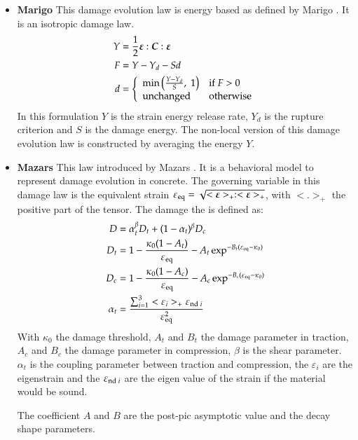 \begin{itemize}
\item \textbf{Marigo}
This damage evolution law is energy based as defined by Marigo \cite{marigo81a,
  lemaitre96a}. It is an isotropic damage law.
\begin{align}
  Y &= \frac{1}{2}\boldsymbol{\varepsilon}:\boldsymbol{C}:\boldsymbol{\varepsilon}\\
  F &= Y - Y_d - S d\\
  d &= \left\{
    \begin{array}{l l}
      \mathrm{min}\left(\frac{Y-Y_d}{S},\;1\right) & \mathrm{if}\; F > 0\\
      \mathrm{unchanged} & \mathrm{otherwise}
    \end{array}
  \right.
\end{align}
In this formulation $Y$ is the strain  energy release rate, $Y_d$ is the rupture
criterion and  $S$ is the damage  energy.  The non-local version  of this damage
evolution law is constructed by averaging the energy $Y$.

\item \textbf{Mazars}
This law introduced by Mazars \cite{mazars84a}. It is a behavioral model to
represent damage evolution in concrete. The governing variable in this damage
law is the equivalent strain $\varepsilon_{{\mathrm{eq}}} =
\sqrt{<\boldsymbol{\varepsilon}>_+:<\boldsymbol{\varepsilon}>_+}$, with $<.>_+$ the positive
part of the tensor.
The damage the is defined as:
\begin{align}
  D &= \alpha_t^\beta D_t + (1-\alpha_t)^\beta D_c\\
  D_t &= 1 - \frac{\kappa_0 (1- A_t)}{\varepsilon_{{\mathrm{eq}}}} - A_t \exp^{-B_t(\varepsilon_{{\mathrm{eq}}}-\kappa_0)}\\
  D_c &= 1 - \frac{\kappa_0 (1- A_c)}{\varepsilon_{{\mathrm{eq}}}} - A_c
  \exp^{-B_c(\varepsilon_{{\mathrm{eq}}}-\kappa_0)}\\
  \alpha_t &= \frac{\sum_{i=1}^3<\varepsilon_i>_+\varepsilon_{{\mathrm{nd}}\;i}}{\varepsilon_{{\mathrm{eq}}}^2}
\end{align}
With $\kappa_0$ the damage threshold, $A_t$ and $B_t$ the damage parameter in
traction, $A_c$ and $B_c$ the damage parameter in compression, $\beta$ is the
shear parameter. $\alpha_t$ is the coupling parameter between traction and
compression, the $\varepsilon_i$ are the eigenstrain and the
$\varepsilon_{{\mathrm{nd}}\;i}$ are the eigen value of the strain if the material
would be sound.

The coefficient $A$ and $B$ are the post-pic asymptotic
value and the decay shape parameters.
\end{itemize}

